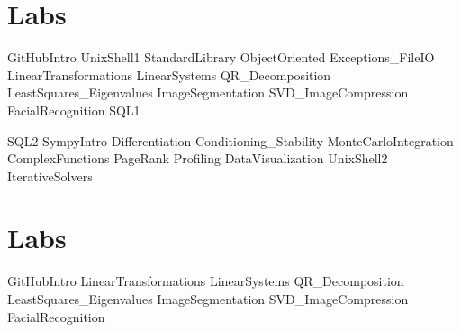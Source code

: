 \documentclass[opener-c,labs,blue,nociteref]{HJnewsiambook}
\begin{document}
\ifbyu

\part{Labs} %
{GitHubIntro}
{UnixShell1}
{StandardLibrary}
{ObjectOriented}
{Exceptions_FileIO}
{LinearTransformations}
{LinearSystems}
{QR_Decomposition}
{LeastSquares_Eigenvalues}
{ImageSegmentation}
{SVD_ImageCompression}
{FacialRecognition}
{SQL1}

{SQL2}
{SympyIntro}
{Differentiation}
{Conditioning_Stability}
{MonteCarloIntegration}
{ComplexFunctions}
{PageRank}
{Profiling}
{DataVisualization}
{UnixShell2}
{IterativeSolvers}

\else 

\part{Labs} %
{GitHubIntro}
{LinearTransformations}
{LinearSystems}
{QR_Decomposition}
{LeastSquares_Eigenvalues}
{ImageSegmentation}
{SVD_ImageCompression}
{FacialRecognition}
\end{document}
